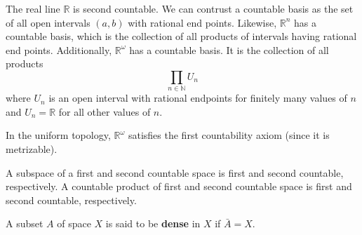   \begin{example}
    The real line $\mathbb{R}$ is second countable. We can contrust a countable basis as the set of all open intervals $(a, b)$ with rational end points. Likewise, $\mathbb{R}^n$ has a countable basis, which is the collection of all products of intervals having rational end points. Additionally, $\mathbb{R}^\omega$ has a countable basis. It is the collection of all products
    \begin{equation}
      \prod_{n \in \mathbb{N}} U_n
    \end{equation}
    where $U_n$ is an open interval with rational endpoints for finitely many values of $n$ and $U_n = \mathbb{R}$ for all other values of $n$. 
  \end{example}

  \begin{example}
    In the uniform topology, $\mathbb{R}^\omega$ satisfies the first countability axiom (since it is metrizable). 
  \end{example}

  \begin{theorem}
    A subspace of a first and second countable space is first and second countable, respectively. A countable product of first and second countable space is first and second countable, respectively. 
  \end{theorem}

  \begin{theorem}
    A subset $A$ of space $X$ is said to be \textbf{dense} in $X$ if $\bar{A} = X$. 
  \end{theorem}

